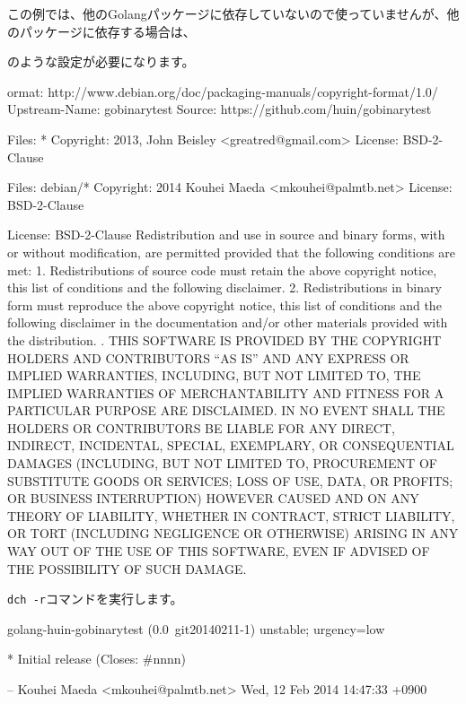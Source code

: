 \documentclass[mingoth,a4paper]{jsarticle}
\begin{document}
この例では、他のGolangパッケージに依存していないので使っていませんが、他のパッケージに依存する場合は、


のような設定が必要になります。

\begin{commandline}
ormat: http://www.debian.org/doc/packaging-manuals/copyright-format/1.0/
Upstream-Name: gobinarytest
Source: https://github.com/huin/gobinarytest

Files: *
Copyright: 2013, John Beisley <greatred@gmail.com>
License: BSD-2-Clause

Files: debian/*
Copyright: 2014 Kouhei Maeda <mkouhei@palmtb.net>
License: BSD-2-Clause

License: BSD-2-Clause
 Redistribution and use in source and binary forms, with or without
 modification, are permitted provided that the following conditions
 are met:
 1. Redistributions of source code must retain the above copyright
    notice, this list of conditions and the following disclaimer.
 2. Redistributions in binary form must reproduce the above copyright
    notice, this list of conditions and the following disclaimer in the
    documentation and/or other materials provided with the distribution.
 .
 THIS SOFTWARE IS PROVIDED BY THE COPYRIGHT HOLDERS AND CONTRIBUTORS
 ``AS IS'' AND ANY EXPRESS OR IMPLIED WARRANTIES, INCLUDING, BUT NOT 
 LIMITED TO, THE IMPLIED WARRANTIES OF MERCHANTABILITY AND FITNESS FOR
 A PARTICULAR PURPOSE ARE DISCLAIMED.  IN NO EVENT SHALL THE HOLDERS OR
 CONTRIBUTORS BE LIABLE FOR ANY DIRECT, INDIRECT, INCIDENTAL, SPECIAL, 
 EXEMPLARY, OR CONSEQUENTIAL DAMAGES (INCLUDING, BUT NOT LIMITED TO, 
 PROCUREMENT OF SUBSTITUTE GOODS OR SERVICES; LOSS OF USE, DATA, OR 
 PROFITS; OR BUSINESS INTERRUPTION) HOWEVER CAUSED AND ON ANY THEORY OF 
 LIABILITY, WHETHER IN CONTRACT, STRICT LIABILITY, OR TORT (INCLUDING 
 NEGLIGENCE OR OTHERWISE) ARISING IN ANY WAY OUT OF THE USE OF THIS 
 SOFTWARE, EVEN IF ADVISED OF THE POSSIBILITY OF SUCH DAMAGE.
\end{commandline}


\texttt{dch -r}コマンドを実行します。

\begin{commandline}
golang-huin-gobinarytest (0.0~git20140211-1) unstable; urgency=low

  * Initial release (Closes: #nnnn)

 -- Kouhei Maeda <mkouhei@palmtb.net>  Wed, 12 Feb 2014 14:47:33 +0900
\end{commandline}
\end{document}
